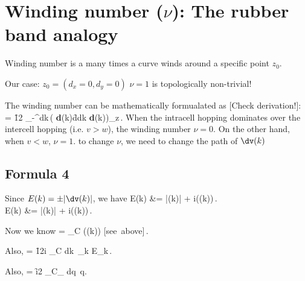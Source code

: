 \section{Winding number ($\nu$): The rubber band analogy} 
Winding number is a  many times a curve winds around a specific point $z_0$. 

\alert{Our case:}
 $z_0 = (d_x=0,d_y=0)$ $\nu=1$ is {\blue topologically non-trivial!}

The winding number can be mathematically formualated as
[{\red Check derivation!}]:
\blgn
\nu = \f{1}{2\pi} \int_{-\pi}^{\pi}dk\,\bigg( \h {\bf d}(k)\times \f{d}{dk}  \h {\bf d}(k)\bigg)_z\,.
\elgn
When the intracell hopping dominates over the intercell hopping (i.e. $v > w$), the winding number 
$\nu = 0$. On the other hand, when $v < w $, $\nu = 1$. to change $\nu$, we need to change the path 
of $\dv(k)$

\subsection*{Formula 4}
Since $E(k)=\pm|\dv(k)|$, we have
\blgn
 \ln E(k) &= \ln |\dv(k)| + i\arg(\dv(k))\,.\non\\
 \Ra \pdk \ln E(k) &= \pdk\ln |\dv(k)| + i\pdk\arg(\dv(k))\,.
\elgn

Now we know
\blgn
\nu = \finvtwpi \oint_C \pdk\arg(\dv(k)) \quad\mbox{[see above]}\,.  
\elgn

Also,
\blgn
\nu = \f{1}{2\pi i} \oint_C dk\, \pd_k \ln E_k\,. 
\elgn

Also,
\blgn
\nu = \f{i}{2\pi} \int_{C_\beta} dq\, q\inv. 
\elgn
 
